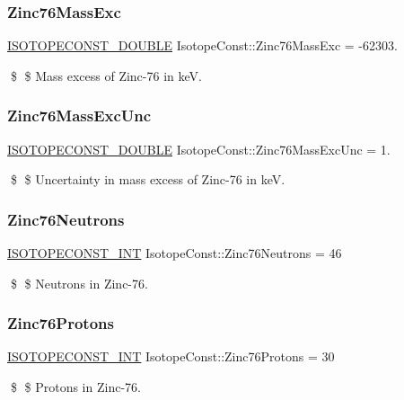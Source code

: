 \subsubsection{\texorpdfstring{Zinc76\+Mass\+Exc}{Zinc76MassExc}}
{\footnotesize\ttfamily \mbox{\hyperlink{group___isotope_const-_macros_ga8f45a7272ce02c0b4c65c44636ed719a}{I\+S\+O\+T\+O\+P\+E\+C\+O\+N\+S\+T\+\_\+\+D\+O\+U\+B\+LE}} Isotope\+Const\+::\+Zinc76\+Mass\+Exc = -\/62303.}

\$ \$ Mass excess of Zinc-\/76 in keV. \mbox{\label{group___isotope_const-_zinc-_zn76_gaeb730f2aa2600b6052f35978e50d35da}} 
\subsubsection{\texorpdfstring{Zinc76\+Mass\+Exc\+Unc}{Zinc76MassExcUnc}}
{\footnotesize\ttfamily \mbox{\hyperlink{group___isotope_const-_macros_ga8f45a7272ce02c0b4c65c44636ed719a}{I\+S\+O\+T\+O\+P\+E\+C\+O\+N\+S\+T\+\_\+\+D\+O\+U\+B\+LE}} Isotope\+Const\+::\+Zinc76\+Mass\+Exc\+Unc = 1.}

\$ \$ Uncertainty in mass excess of Zinc-\/76 in keV. \mbox{\label{group___isotope_const-_zinc-_zn76_ga3167e660521b54b3513b7919d0b7d1e1}} 
\subsubsection{\texorpdfstring{Zinc76\+Neutrons}{Zinc76Neutrons}}
{\footnotesize\ttfamily \mbox{\hyperlink{group___isotope_const-_macros_ga5f18360b3e99483a35c32d789e62621c}{I\+S\+O\+T\+O\+P\+E\+C\+O\+N\+S\+T\+\_\+\+I\+NT}} Isotope\+Const\+::\+Zinc76\+Neutrons = 46}

\$ \$ Neutrons in Zinc-\/76. \mbox{\label{group___isotope_const-_zinc-_zn76_gac16d5adc32aa47bdcda57e951ba72201}} 
\subsubsection{\texorpdfstring{Zinc76\+Protons}{Zinc76Protons}}
{\footnotesize\ttfamily \mbox{\hyperlink{group___isotope_const-_macros_ga5f18360b3e99483a35c32d789e62621c}{I\+S\+O\+T\+O\+P\+E\+C\+O\+N\+S\+T\+\_\+\+I\+NT}} Isotope\+Const\+::\+Zinc76\+Protons = 30}

\$ \$ Protons in Zinc-\/76. 